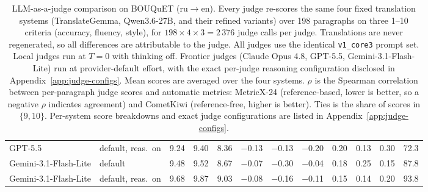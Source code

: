 \begin{table}[t]
\begin{tabular}{@{}llcccccccccc@{}}
GPT-5.5                & default, reas.\ on & 9.24 & 9.40 & 8.36 & $-$0.13 & $-$0.13 & $-$0.20 & 0.20 & 0.13 & 0.30 & 72.3 \\
Gemini-3.1-Flash-Lite  & default            & 9.48 & 9.52 & 8.67 & $-$0.07 & $-$0.30 & $-$0.04 & 0.18 & 0.25 & 0.15 & 87.8 \\
\addlinespace
Gemini-3.1-Flash-Lite  & default, reas.\ on & 9.68 & 9.87 & 9.03 & $-$0.08 & $-$0.16 & $-$0.11 & 0.15 & 0.14 & 0.20 & 93.8 \\
\bottomrule
\end{tabular}
\caption{LLM-as-a-judge comparison on BOUQuET (ru$\rightarrow$en).
Every judge re-scores the same four fixed translation systems (TranslateGemma,
Qwen3.6-27B, and their refined variants) over 198 paragraphs on three 1--10
criteria (accuracy, fluency, style), for $198 \times 4 \times 3 = 2\,376$ judge
calls per judge. Translations are never regenerated, so all differences are
attributable to the judge. All judges use the identical \texttt{v1\_core3}
prompt set. Local judges run at $T{=}0$ with thinking off. Frontier judges
(Claude Opus 4.8, GPT-5.5, Gemini-3.1-Flash-Lite) run at provider-default
effort, with the exact per-judge reasoning configuration disclosed in
Appendix~\ref{app:judge-configs}. Mean scores are averaged over the four
systems. $\rho$ is the Spearman correlation between per-paragraph judge
scores and automatic metrics: MetricX-24 (reference-based, lower is better,
so a negative $\rho$ indicates agreement) and CometKiwi (reference-free,
higher is better). Ties is the share of scores in $\{9,10\}$.
Per-system score breakdowns and exact judge configurations are listed in
Appendix~\ref{app:judge-configs}.}
\label{tab:judge-comparison}
\end{table}
